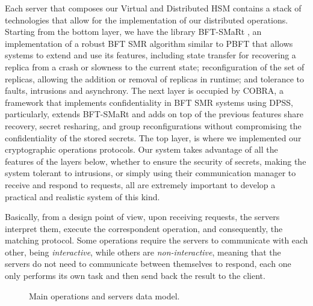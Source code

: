 Each server that composes our Virtual and Distributed HSM contains a stack of technologies that allow for the implementation of our distributed operations. Starting from the bottom layer, we have the library BFT-SMaRt \cite{bftsmart}, an implementation of a robust BFT SMR algorithm similar to PBFT \cite{pbft} that allows systems to extend and use its features, including state transfer for recovering a replica from a crash or slowness to the current state; reconfiguration of the set of replicas, allowing the addition or removal of replicas in runtime; and tolerance to faults, intrusions and asynchrony. The next layer is occupied by COBRA, a framework that implements confidentiality in BFT SMR systems using DPSS, particularly, extends BFT-SMaRt and adds on top of the previous features share recovery, secret resharing, and group reconfigurations without compromising the confidentiality of the stored secrets. The top layer, is where we implemented our cryptographic operations protocols. Our system takes advantage of all the features of the layers below, whether to ensure the security of secrets, making the system tolerant to intrusions, or simply using their communication manager to receive and respond to requests, all are extremely important to develop a practical and realistic system of this kind.

Basically, from a design point of view, upon receiving requests, the servers interpret them, execute the correspondent operation, and consequently, the matching protocol. Some operations require the servers to communicate with each other, being \textit{interactive}, while others are \textit{non-interactive}, meaning that the servers do not need to communicate between themselves to respond, each one only performs its own task and then send back the result to the client.

\begin{figure}[h]
    \begin{center}
    \end{center}
    \caption{Main operations and servers data model.}
    \label{fig:4.data_model}
\end{figure}

